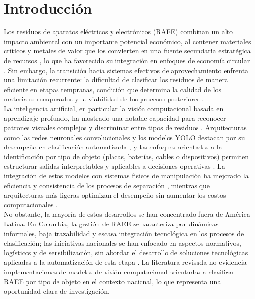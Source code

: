 \chapter*{Introducción}


Los residuos de aparatos eléctricos y electrónicos (RAEE) combinan un alto impacto ambiental con un importante potencial económico, al contener materiales críticos y metales de valor que los convierten en una fuente secundaria estratégica de recursos \cite{leeEnvironmentalEconomicImpacts2024b}, lo que ha favorecido su integración en enfoques de economía circular \cite{heDrivingSustainableCircular2024}. Sin embargo, la transición hacia sistemas efectivos de aprovechamiento enfrenta una limitación recurrente: la dificultad de clasificar los residuos de manera eficiente en etapas tempranas, condición que determina la calidad de los materiales recuperados y la viabilidad de los procesos posteriores \cite{janoClosingLoopSystematic2026}.\\

La inteligencia artificial, en particular la visión computacional basada en aprendizaje profundo, ha mostrado una notable capacidad para reconocer patrones visuales complejos y discriminar entre tipos de residuos \cite{sharmaEnablersComputerVision2023}. Arquitecturas como las redes neuronales convolucionales y los modelos YOLO destacan por su desempeño en clasificación automatizada \cite{rajeevAdvancingEwasteClassification2025a}, y los enfoques orientados a la identificación por tipo de objeto (placas, baterías, cables o dispositivos) permiten estructurar salidas interpretables y aplicables a decisiones operativas \cite{ilievEmbeddedSystemEwaste2023}. La integración de estos modelos con sistemas físicos de manipulación ha mejorado la eficiencia y consistencia de los procesos de separación \cite{wangImprovedYOLObasedWaste2023}, mientras que arquitecturas más ligeras optimizan el desempeño sin aumentar los costos computacionales \cite{oiseEViTNetLightweightVision2026}.\\

No obstante, la mayoría de estos desarrollos se han concentrado fuera de América Latina. En Colombia, la gestión de RAEE se caracteriza por dinámicas informales, baja trazabilidad y escasa integración tecnológica en los procesos de clasificación; las iniciativas nacionales se han enfocado en aspectos normativos, logísticos y de sensibilización, sin abordar el desarrollo de soluciones tecnológicas aplicadas a la automatización de esta etapa \cite{guiaRAEEColombia2023}. La literatura revisada no evidencia implementaciones de modelos de visión computacional orientados a clasificar RAEE por tipo de objeto en el contexto nacional, lo que representa una oportunidad clara de investigación.\\

